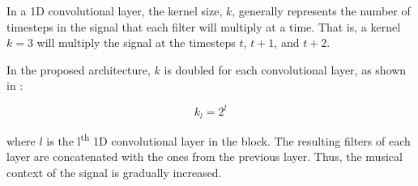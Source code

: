 
In a 1D convolutional layer, the kernel size, $k$, generally
represents the number of timesteps in the signal that each
filter will multiply at a time. That is, a kernel $k=3$ will
multiply the signal at the timesteps $t$, $t+1$, and $t+2$.

In the proposed architecture, $k$ is doubled for each
convolutional layer, as shown in :

\begin{equation}
    \label{eq:kernel_size}
    k_l = 2^{l}
\end{equation}

where $l$ is the l\textsuperscript{th} 1D convolutional
layer in the block. The resulting filters of each layer are
concatenated with the ones from the previous layer. Thus,
the musical context of the signal is gradually increased.
